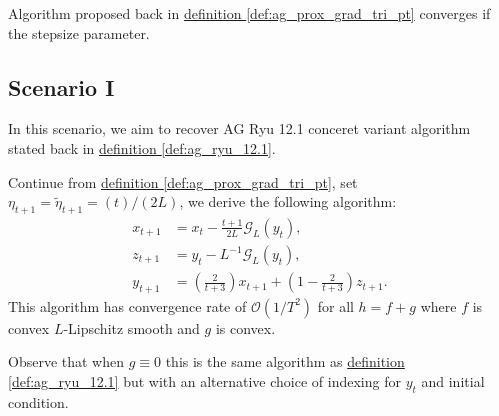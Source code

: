 \documentclass[12pt]{article}
\begin{document}
        \begin{theorem}
            Algorithm proposed back in 
            \hyperref[def:ag_prox_grad_tri_pt]{definition \ref*{def:ag_prox_grad_tri_pt}}
            converges if the stepsize parameter. 
        \end{theorem}

    \subsection{Scenario I}\label{sec:scenario_i}
        In this scenario, we aim to recover AG Ryu 12.1 conceret variant algorithm stated back in 
        \hyperref[def:ag_ryu_12.1]{definition \ref*{def:ag_ryu_12.1}}. 
        \begin{proposition}
            Continue from
            \hyperref[def:ag_prox_grad_tri_pt]{definition \ref*{def:ag_prox_grad_tri_pt}}, 
            set $\eta_{t + 1} = \tilde \eta_{t + 1} = (t)/(2L)$, we derive the following algorithm: 
            \begin{align*}
                x_{t + 1} &= x_t - \frac{t + 1}{2L} \mathcal G_L(y_t), 
                \\
                z_{t + 1} &= y_t - L^{-1} \mathcal G_L(y_t), 
                \\
                y_{t + 1} &= 
                \left(
                    \frac{2}{t + 3}
                \right)x_{t +1} + 
                \left(
                    1 - \frac{2}{t + 3}
                \right)z_{t + 1}. 
            \end{align*}
            This algorithm has convergence rate of $\mathcal O(1/T^2)$ for all $h = f + g$ where $f$ is convex $L$-Lipschitz smooth and $g$ is convex. 
        \end{proposition}
        \begin{observation}
            Observe that when $g \equiv 0$ this is the same algorithm as 
            \hyperref[def:ag_ryu_12.1]{definition \ref*{def:ag_ryu_12.1}}
            but with an alternative choice of indexing for $y_t$ and initial condition. 
        \end{observation}
\end{document}

